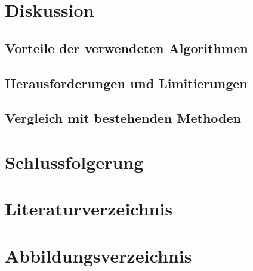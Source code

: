 \documentclass[a4paper,12pt,twoside]{article}
\begin{document}
\section{Diskussion}
\subsection{Vorteile der verwendeten Algorithmen}
\subsection{Herausforderungen und Limitierungen}
\subsection{Vergleich mit bestehenden Methoden}

\section{Schlussfolgerung}
\section{Literaturverzeichnis}
\section{Abbildungsverzeichnis}
\end{document}
